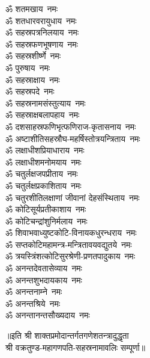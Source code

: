 \begin{multicols}{2}
\begin{flushleft}
ॐ शतमखाय~नमः\\
ॐ शतधारवरायुधाय~नमः\\
ॐ सहस्रपत्रनिलयाय~नमः\\
ॐ सहस्रफणभूषणाय~नमः\\
ॐ सहस्रशीर्ष्णे~नमः\\
ॐ पुरुषाय~नमः\\
ॐ सहस्राक्षाय~नमः\\
ॐ सहस्रपदे~नमः\\
ॐ सहस्रनामसंस्तुत्याय~नमः\hfill{}\\
ॐ सहस्राक्षबलापहाय~नमः\\
ॐ दशसाहस्रफणिभृत्फणिराज-कृतासनाय~नमः\\
ॐ अष्टाशीतिसहस्रौघ-महर्षिस्तोत्रयन्त्रिताय~नमः\\
ॐ लक्षाधीशप्रियाधाराय~नमः\\
ॐ लक्षाधीशमनोमयाय~नमः\\
ॐ चतुर्लक्षजपप्रीताय~नमः\\
ॐ चतुर्लक्षप्रकाशिताय~नमः\\
ॐ चतुरशीतिलक्षाणां जीवानां देहसंस्थिताय~नमः\\
ॐ कोटिसूर्यप्रतीकाशाय~नमः\\
ॐ कोटिचन्द्रांशुनिर्मलाय~नमः\hfill{}\\
ॐ शिवाभवाध्युष्टकोटि-विनायकधुरन्धराय~नमः\\
ॐ सप्तकोटिमहामन्त्र-मन्त्रितावयवद्युतये~नमः\\
ॐ त्रयस्त्रिंशत्कोटिसुरश्रेणी-प्रणतपादुकाय~नमः\\
ॐ अनन्तदेवतासेव्याय~नमः\\
ॐ अनन्तशुभदायकाय~नमः\\
ॐ अनन्तनाम्ने~नमः\\
ॐ अनन्तश्रिये~नमः\\
ॐ अनन्तानन्तसौख्यदाय~नमः\\
\end{flushleft}
\end{multicols}
॥इति श्री शाक्तप्रमोदान्तर्गतगणेशतन्त्रादुद्धृता\\
श्री वक्रतुण्ड-महागणपति-सहस्रनामावलिः सम्पूर्णा॥
